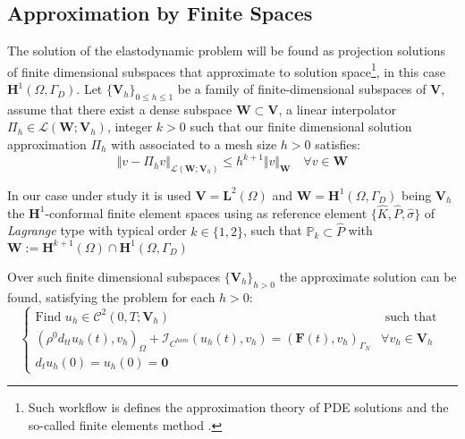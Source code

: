 \subsection{Approximation by Finite Spaces}
The solution of the elastodynamic problem will be found as projection solutions of finite dimensional subspaces that approximate to solution space\footnote{Such workflow is defines the approximation theory of PDE solutions and the so-called finite elements method \cite{ern2004theory}.}, in this case $\mathbf{H}^1(\Omega, \Gamma_D)$.
Let $\{\mathbf{V}_h \}_{0 \leq h \leq 1}$ be a family of finite-dimensional subspaces of $\mathbf{V}$, assume that there exist a dense subspace $\mathbf{W} \subset \mathbf{V}$, a linear interpolator $\Pi_h \in \mathcal{L}(\mathbf{W};\mathbf{V}_h)$, integer $k > 0$ such that our finite dimensional solution approximation $\Pi_{h} $ with associated to a mesh size $h>0$ satisfies:
\begin{equation*}
    \Vert v - \Pi_h v \Vert_{\mathcal{L}(\mathbf{W};\mathbf{V}_h)} \leq h^{k+1} \Vert v \Vert_{\mathbf{W}} \quad \forall v \in \mathbf{W}
\end{equation*}
\begin{rem}
In our case under study it is used $\mathbf{V} = \mathbf{L}^2(\Omega)$ and $\mathbf{W} = \mathbf{H}^1(\Omega, \Gamma_D)$ being $\mathbf{V}_h$ the $\mathbf{H}^1$-conformal finite element spaces using as reference element $\{ \hat{K}, \hat{P}, \hat{\sigma} \}$ of \textit{Lagrange} type with typical order $k \in \{1,2\}$, such that $\mathbb{P}_k \subset \hat{P}$ with $\mathbf{W} := \mathbf{H}^{k+1}(\Omega) \cap \mathbf{H}^1(\Omega, \Gamma_D)$
\end{rem}

Over such finite dimensional subspaces $\{ \mathbf{V}_h\}_{h>0}$ the approximate solution can be found, satisfying the problem for each $h>0$:
\begin{equation}
\label{ODE-Discretized}
    \left \{
    \begin{array}{cc}
        \text{Find } u_h \in \mathcal{C}^2(0,T; \mathbf{V}_h) & \text{ such that } \\
        (\rho^0 d_{tt} u_h(t), v_h)_{\Omega} + \mathcal{I}_{C^{hom}}(u_h(t), v_h) = (\mathbf{F}(t), v_h)_{\Gamma_N} & \forall v_h \in \mathbf{V}_h\\
        d_t u_h(0) = u_h(0) = \mathbf{0} & 
    \end{array}
    \right. 
\end{equation}

